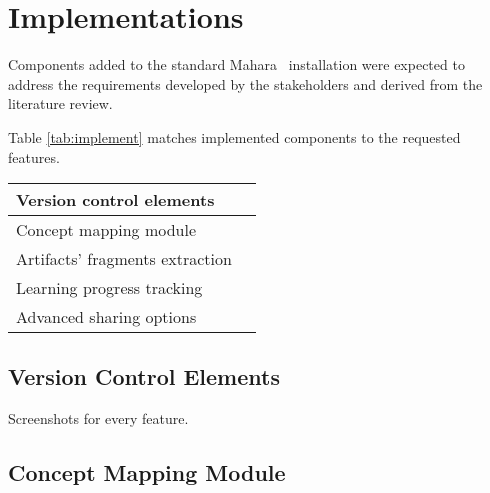\section{Implementations}

Components added to the standard Mahara \ep~installation were expected to
address the requirements developed by the stakeholders and derived from the
literature review.

Table \ref{tab:implement} matches implemented components to the requested
features.

\begin{center} \small
    \tablelasttail{\hline} 
    \begin{supertabular}{| p{6cm} | p{6cm} |}
    Version control elements & \\ \hline
    Concept mapping module & \\ \hline
    Artifacts' fragments extraction & \\ \hline
    Learning progress tracking & \\ \hline
    Advanced sharing options & \\ \hline
    \end{supertabular}
    \label{tab:implement}
\end{center}

\subsection{Version Control Elements}

Screenshots for every feature.

\subsection{Concept Mapping Module}

